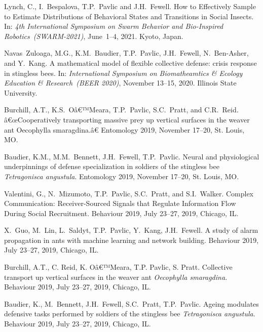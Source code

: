 \documentclass[10pt]{article}
\begin{document}
\begin{bibenum}
    \item Lynch, C., I.~Bespalova, T.P.~Pavlic and J.H.~Fewell.
        How to Effectively Sample to Estimate Distributions of
        Behavioral States and Transitions in Social Insects.
        In: \emph{4th International Symposium on
        Swarm Behavior and Bio-Inspired Robotics~(SWARM-2021)},
        June~1--4, 2021. Kyoto, Japan.

    \item Navas~Zuloaga, M.G., K.M.~Baudier, T.P.~Pavlic, J.H.~Fewell,
        N.~Ben-Asher, and Y.~Kang. A mathematical model of flexible
        collective defense: crisis response in stingless bees. In:
        \emph{International Symposium on Biomatheamtics \& Ecology
        Education \& Research~(BEER 2020)}, November 13--15, 2020.
        Illinois State University.

    \item Burchill, A.T., K.S.~Oâ€™Meara, T.P.~Pavlic, S.C.~Pratt,
        and C.R.~Reid. â€œCooperatively transporting massive prey up
        vertical surfaces in the weaver ant Oecophylla smaragdina.â€
        Entomology 2019, November 17--20, St. Louis, MO.

    \item Baudier, K.M., M.M.~Bennett, J.H.~Fewell, T.P.~Pavlic. Neural
        and physiological underpinnings of defense specialization in
        soldiers of the stingless bee \emph{Tetragonisca angustula}.
        Entomology 2019, November 17--20, St. Louis, MO.

    \item Valentini, G., N.~Mizumoto, T.P.~Pavlic, S.C.~Pratt, and
        S.I.~Walker. Complex Communication: Receiver-Sourced Signals
        that Regulate Information Flow During Social Recruitment.
        Behaviour 2019, July 23--27, 2019, Chicago, IL.

    \item X.~Guo, M.~Lin, L.~Saldyt, T.P.~Pavlic, Y.~Kang, J.H.~Fewell. A
        study of alarm propagation in ants with machine learning and
        network building. Behaviour 2019, July 23--27, 2019, Chicago,
        IL.

    \item Burchill, A.T., C. Reid, K. Oâ€™Meara, T.P. Pavlic, S. Pratt.
        Collective transport up vertical surfaces in the weaver ant
        \emph{Oecophylla smaragdina.} Behaviour 2019, July 23--27, 2019,
        Chicago, IL.

    \item Baudier, K., M.~Bennett, J.H.~Fewell, S.C.~Pratt, T.P.~Pavlic.
        Ageing modulates defensive tasks performed by soldiers of the
        stingless bee \emph{Tetragonisca angustula}. Behaviour 2019, July
        23--27, 2019, Chicago, IL.


\end{bibenum}
\end{document}
